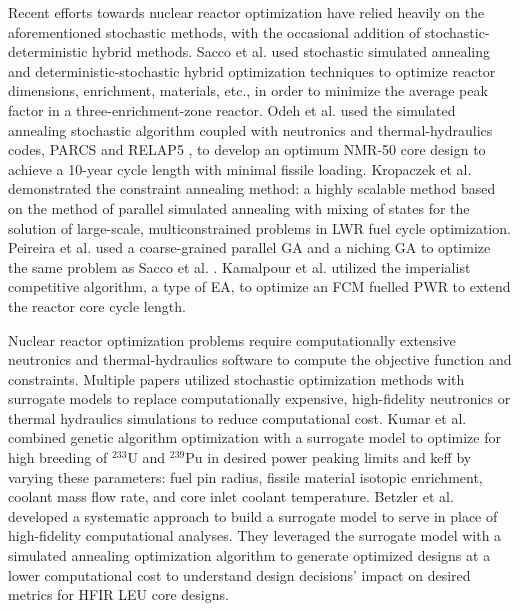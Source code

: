 Recent efforts towards nuclear reactor optimization have relied heavily on 
the aforementioned stochastic methods, with the occasional addition of 
stochastic-deterministic hybrid methods. 
Sacco et al. \cite{sacco_two_2006,sacco_metropolis_2008} used stochastic 
simulated annealing and deterministic-stochastic hybrid optimization techniques 
to optimize reactor dimensions, enrichment, materials, etc., in order to 
minimize the average peak factor in a three-enrichment-zone reactor. 
Odeh et al. \cite{odeh_core_2016} used the simulated annealing stochastic algorithm 
coupled with neutronics and thermal-hydraulics codes, \gls{PARCS} and RELAP5
\cite{fletcher_relap5mod3_1992}, to develop an optimum \gls{NMR-50} core design 
to achieve a 10-year cycle length with minimal fissile loading. 
Kropaczek et al. \cite{kropaczek_large-scale_2019} demonstrated the constraint 
annealing method: a highly scalable method based on the method of parallel 
simulated annealing with mixing of states \cite{kropaczek_constraint_2019} for 
the solution of large-scale, multiconstrained problems in \gls{LWR} fuel cycle 
optimization. 
Peireira et al. \cite{pereira_coarse-grained_2003,pereira_parallel_2008} 
used a coarse-grained parallel \gls{GA} and a niching \gls{GA}
to optimize the same problem as Sacco et al. \cite{sacco_two_2006}. 
Kamalpour et al. \cite{kamalpour_smart_2020} utilized the imperialist competitive 
algorithm, a type of \gls{EA}, to optimize an \gls{FCM} fuelled 
\gls{PWR} to extend the reactor core cycle length. 

Nuclear reactor optimization problems require computationally 
extensive neutronics and thermal-hydraulics software to compute the objective 
function and constraints. 
Multiple papers utilized stochastic optimization methods with surrogate models 
to replace computationally expensive, high-fidelity neutronics or thermal hydraulics 
simulations to reduce computational cost.
Kumar et al. \cite{kumar_new_2015} combined genetic algorithm optimization 
with a surrogate model to optimize for high breeding of $^{233}$U and $^{239}$Pu 
in desired power peaking limits and keff by varying these parameters: fuel pin 
radius,  fissile material isotopic enrichment, coolant mass flow rate, and 
core inlet coolant temperature.
Betzler et al. \cite{betzler_design_2019} developed a systematic approach to 
build a surrogate model to serve in place of high-fidelity computational 
analyses. 
They leveraged the surrogate model with a simulated annealing optimization 
algorithm to generate optimized designs at a lower computational cost to 
understand design decisions' impact on desired metrics for \gls{HFIR} \gls{LEU} 
core designs.

